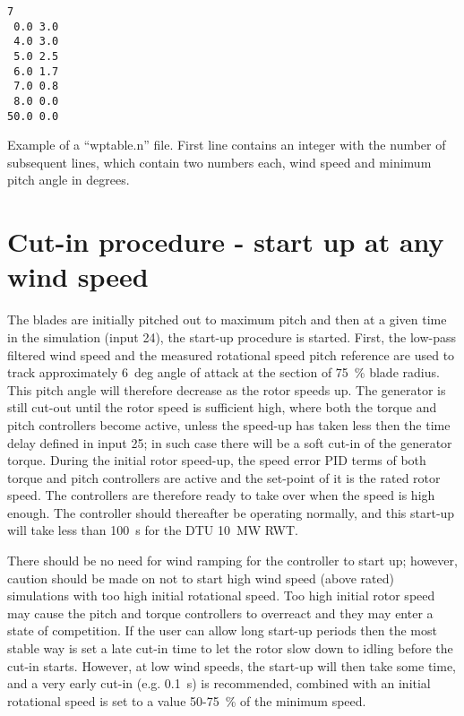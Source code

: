 \begin{table}[t]
\begin{center}
\begin{verbatim}
7
 0.0 3.0
 4.0 3.0
 5.0 2.5
 6.0 1.7
 7.0 0.8
 8.0 0.0
50.0 0.0
\end{verbatim}
\caption{Example of a ``wptable.n'' file. First line contains an integer with the number of subsequent lines, which contain two numbers each, wind speed and minimum pitch angle in degrees.\label{t:wptable}}
\end{center}
\end{table}

\section{Cut-in procedure - start up at any wind speed}

The blades are initially pitched out to maximum pitch and then at a given time in the simulation (input 24), the start-up procedure is started. First, the low-pass filtered wind speed and the measured rotational speed pitch reference are used to track approximately 6~deg angle of attack at the section of 75~\% blade radius. This pitch angle will therefore decrease as the rotor speeds up. The generator is still cut-out until the rotor speed is sufficient high, where both the torque and pitch controllers become active, unless the speed-up has taken less then the time delay defined in input 25; in such case there will be a soft cut-in of the generator torque. During the initial rotor speed-up, the speed error PID terms of both torque and pitch controllers are active and the set-point of it is the rated rotor speed. The controllers are therefore ready to take over when the speed is high enough. The controller should thereafter be operating normally, and this start-up will take less than 100~s for the DTU 10~MW RWT.

There should be no need for wind ramping for the controller to start up; however, caution should be made on not to start high wind speed (above rated) simulations with too high initial rotational speed. Too high initial rotor speed may cause the pitch and torque controllers to overreact and they may enter a state of competition. If the user can allow long start-up periods then the most stable way is set a late cut-in time to let the rotor slow down to idling before the cut-in starts. However, at low wind speeds, the start-up will then take some time, and a very early cut-in (e.g. 0.1~s) is recommended, combined with an initial rotational speed is set to a value 50-75~\% of the minimum speed.


